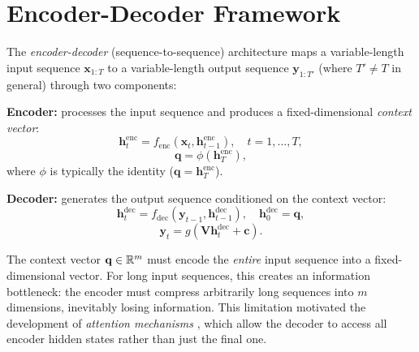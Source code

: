 \documentclass[11pt,a4paper]{article}
\begin{document}
\section{Encoder-Decoder Framework}
\label{sec:encoder-decoder}

\begin{definition}
\label{def:enc-dec}
The \emph{encoder-decoder} (sequence-to-sequence) architecture
\citep{sutskever2014,cho2014} maps a variable-length input sequence
$\mathbf{x}_{1:T}$ to a variable-length output sequence
$\mathbf{y}_{1:T'}$ (where $T' \neq T$ in general) through two
components:

\textbf{Encoder:} processes the input sequence and produces a
fixed-dimensional \emph{context vector}:
\begin{equation}
  \mathbf{h}_t^{\text{enc}} = f_{\text{enc}}(\mathbf{x}_t,
    \mathbf{h}_{t-1}^{\text{enc}}), \quad t = 1, \ldots, T,
  \label{eq:encoder}
\end{equation}
\begin{equation}
  \mathbf{q} = \phi(\mathbf{h}_T^{\text{enc}}),
  \label{eq:context}
\end{equation}
where $\phi$ is typically the identity ($\mathbf{q} =
\mathbf{h}_T^{\text{enc}}$).

\textbf{Decoder:} generates the output sequence conditioned on the
context vector:
\begin{equation}
  \mathbf{h}_t^{\text{dec}} = f_{\text{dec}}(\mathbf{y}_{t-1},
    \mathbf{h}_{t-1}^{\text{dec}}), \quad
    \mathbf{h}_0^{\text{dec}} = \mathbf{q},
  \label{eq:decoder}
\end{equation}
\begin{equation}
  \mathbf{y}_t = g(\mathbf{V} \mathbf{h}_t^{\text{dec}} +
    \mathbf{c}).
  \label{eq:decoder-output}
\end{equation}
\end{definition}

\begin{remark}
\label{rem:bottleneck}
The context vector $\mathbf{q} \in \mathbb{R}^m$ must encode the
\emph{entire} input sequence into a fixed-dimensional vector.  For
long input sequences, this creates an information bottleneck: the
encoder must compress arbitrarily long sequences into $m$ dimensions,
inevitably losing information.  This limitation motivated the
development of \emph{attention mechanisms} \citep{bahdanau2015},
which allow the decoder to access all encoder hidden states
rather than just the final one.
\end{remark}
\end{document}
